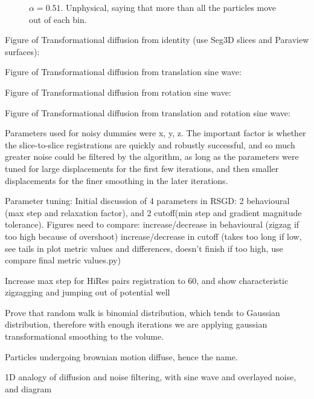\begin{figure}[htbp]
        \caption{$\alpha = 0.51$. Unphysical, saying that more than all the particles move out of each bin.}
    	  \label{fig:1d_diffusion_0_51}
      \end{figure}

      Figure of Transformational diffusion from identity (use Seg3D slices and Paraview surfaces):
      
      Figure of Transformational diffusion from translation sine wave:
      
      Figure of Transformational diffusion from rotation sine wave:
      
      Figure of Transformational diffusion from translation and rotation sine wave:
      
      Parameters used for noisy dummies were x, y, z. The important factor is whether the slice-to-slice registrations are quickly and robustly successful, and so much greater noise could be filtered by the algorithm, as long as the parameters were tuned for large displacements for the first few iterations, and then smaller displacements for the finer smoothing in the later iterations.
      
      Parameter tuning:
      Initial discussion of 4 parameters in RSGD: 2 behavioural (max step and relaxation factor), and 2 cutoff(min step and gradient magnitude tolerance).
      Figures need to compare:
        increase/decrease in behavioural (zigzag if too high because of overshoot)
      increase/decrease in cutoff (takes too long if low, see tails in plot metric values and differences, doesn't finish if too high, use compare final metric values.py)
      
      Increase max step for HiRes pairs registration to 60, and show characteristic zigzagging and jumping out of potential well
      
      Prove that random walk is binomial distribution, which tends to Gaussian distribution, therefore with enough iterations we are applying gaussian transformational smoothing to the volume.
      
      Particles undergoing brownian motion diffuse, hence the name.
      
      1D analogy of diffusion and noise filtering, with sine wave and overlayed noise, and diagram
        
